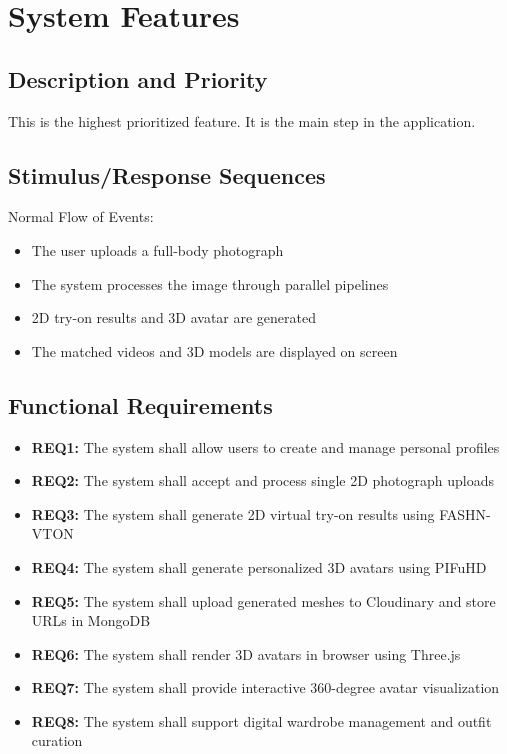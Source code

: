 \documentclass[12pt,a4paper,oneside]{report}
\begin{document}
\section{System Features}

\subsection{Description and Priority}
This is the highest prioritized feature. It is the main step in the application.

\subsection{Stimulus/Response Sequences}
Normal Flow of Events:
\begin{itemize}
    \item The user uploads a full-body photograph
    \item The system processes the image through parallel pipelines
    \item 2D try-on results and 3D avatar are generated
    \item The matched videos and 3D models are displayed on screen
\end{itemize}

\subsection{Functional Requirements}
\begin{itemize}
    \item \textbf{REQ1:} The system shall allow users to create and manage personal profiles
    \item \textbf{REQ2:} The system shall accept and process single 2D photograph uploads
    \item \textbf{REQ3:} The system shall generate 2D virtual try-on results using FASHN-VTON \cite{16}
    \item \textbf{REQ4:} The system shall generate personalized 3D avatars using PIFuHD \cite{1}
    \item \textbf{REQ5:} The system shall upload generated meshes to Cloudinary and store URLs in MongoDB
    \item \textbf{REQ6:} The system shall render 3D avatars in browser using Three.js \cite{6}
    \item \textbf{REQ7:} The system shall provide interactive 360-degree avatar visualization
    \item \textbf{REQ8:} The system shall support digital wardrobe management and outfit curation
\end{itemize}
\end{document}
